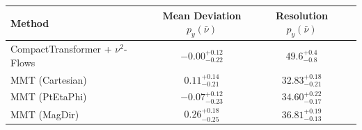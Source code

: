     \begin{tabular}{lccc}
        \toprule
        Method & Mean Deviation $p_{y}(\bar{\nu})$ & Resolution $p_{y}(\bar{\nu})$ \\
        \midrule
        CompactTransformer + $\nu^2$-Flows & $-0.00^{+0.12}_{-0.22}$ & $49.6^{+0.4}_{-0.8}$ \\
        MMT (Cartesian) & $0.11^{+0.14}_{-0.21}$ & $32.83^{+0.18}_{-0.21}$ \\
        MMT (PtEtaPhi) & $-0.07^{+0.12}_{-0.23}$ & $34.60^{+0.22}_{-0.17}$ \\
        MMT (MagDir) & $0.26^{+0.18}_{-0.25}$ & $36.81^{+0.19}_{-0.13}$ \\
        \bottomrule
    \end{tabular}